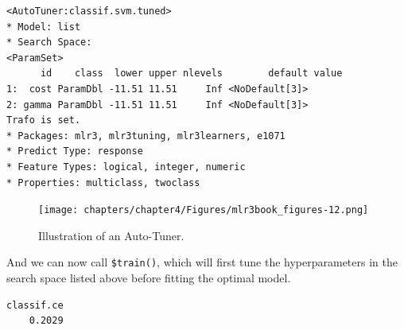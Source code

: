 \begin{Shaded}
\begin{Highlighting}[]
\OtherTok{=} \NormalTok{(}
\NormalTok{)}

\end{Highlighting}
\end{Shaded}

\begin{verbatim}
<AutoTuner:classif.svm.tuned>
* Model: list
* Search Space:
<ParamSet>
      id    class  lower upper nlevels        default value
1:  cost ParamDbl -11.51 11.51     Inf <NoDefault[3]>      
2: gamma ParamDbl -11.51 11.51     Inf <NoDefault[3]>      
Trafo is set.
* Packages: mlr3, mlr3tuning, mlr3learners, e1071
* Predict Type: response
* Feature Types: logical, integer, numeric
* Properties: multiclass, twoclass
\end{verbatim}

\begin{figure}

{\centering \texttt{[image: chapters/chapter4/Figures/mlr3book\_figures-12.png]}

}

\caption{\label{fig-auto-tuner}Illustration of an Auto-Tuner.}

\end{figure}

And we can now call \texttt{\$train()}, which will first tune the
hyperparameters in the search space listed above before fitting the
optimal model.

\begin{Shaded}
\begin{Highlighting}[]
\OtherTok{=} 
\SpecialCharTok{$}\SpecialCharTok{$}
\SpecialCharTok{$}\SpecialCharTok{$}\SpecialCharTok{$}\NormalTok{()}
\end{Highlighting}
\end{Shaded}

\begin{verbatim}
classif.ce 
    0.2029 
\end{verbatim}

